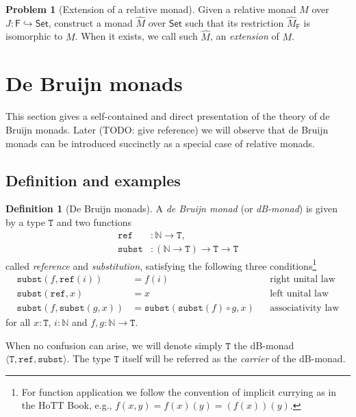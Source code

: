 \documentclass[a4paper,twoside,12pt,draft]{article}
\theoremstyle{definition}
\newtheorem{definition}{Definition}
\newtheorem{problem}{Problem}
\theoremstyle{remark}
\newcommand{\Category}[1]{\mathsf{#1}}
\newcommand{\FCat}{\Category{F}}
\newcommand{\SetCat}{\Category{Set}}
\newcommand{\NN}{\mathbb{N}}
\newcommand{\TT}{\mathtt{T}}
\newcommand{\subst}{\mathtt{subst}}
\newcommand{\refe}{\mathtt{ref}}
\begin{document}
\begin{problem}[Extension of a relative monad]
  Given a relative monad $M$ over $J:\FCat \hookrightarrow \SetCat$,
  construct a monad $\hat M$ over $\SetCat$ such that its restriction
  $\hat M_\FCat$ is isomorphic to $M$.  When it exists, we call such
  $\hat M$, an \emph{extension} of $M$.
\end{problem}

\section{De Bruijn monads}
\label{sec:dbmonads}

This section gives a self-contained and direct presentation of the
theory of de Bruijn monads.  Later (TODO: give reference) we will
observe that de Bruijn monads can be introduced succinctly as a
special case of relative monads.

\subsection{Definition and examples}
\label{sec:def-dbmonad}

\begin{definition}[De Bruijn monads]
  \label{def:dbmonad}
  A \emph{de Bruijn monad} (or \emph{dB-monad}) is given by a type
  $\TT$ and two functions
  \begin{align*}
    \refe &\colon \NN \to \TT, \\
    \subst &\colon (\NN \to \TT) \to \TT \to \TT
  \end{align*}
  called \emph{reference} and \emph{substitution}, satisfying the
  following three conditions\footnote{For function application we
    follow the convention of implicit currying as in the HoTT Book,
    e.g., $f(x,y) = f(x)(y) = (f(x))(y)$.}
  \begin{align*}
    \subst(f,\refe(i)) &=  f(i)
    && \text{right unital law} \\
    \subst(\refe, x) &=  x
    && \text{left unital law} \\
    \subst(f, \subst(g, x)) &= \subst(\subst(f) \circ g, x)
    &&\text{associativity law}
  \end{align*}
  for all $x : \TT$, $i :\NN$ and $f,g\colon \NN \to \TT$.
\end{definition}

When no confusion can arise, we will denote simply $\TT$ the dB-monad
$\langle \TT, \refe, \subst \rangle$.   The type $\TT$ itself will be
referred as the \emph{carrier} of the dB-monad.
\end{document}
